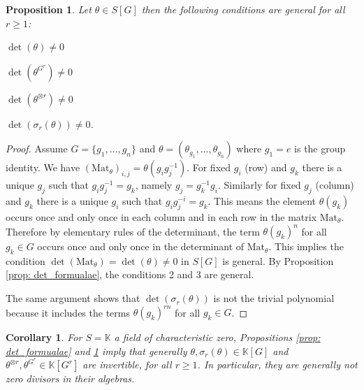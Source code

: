 \documentclass[final]{article}
\newcommand{\K}{\mathbb{K}}
\newcommand{\Mat}{\text{Mat}}
\theoremstyle{definition}
\theoremstyle{plain}
\newtheorem{proposition}[definition]{Proposition}
\newtheorem{corollary}[definition]{Corollary}
\begin{document}
\begin{proposition}\label{prop:general conditions}
    Let $\theta \in S[G]$ then the following conditions are  general for all $r\geq 1$:\vspace{2mm}
    \begin{center}
        
    \begin{enumerate*}
        \item $\det(\theta) \neq 0$\hspace{4mm}
        \item $\det(\theta^{G^r}) \neq 0$\hspace{4mm} 
        \item $\det(\theta^{\otimes r}) \neq 0$\hspace{4mm}
        \item $\det(\sigma_r(\theta)) \neq 0$.
    \end{enumerate*}
    
    \end{center}
    \vspace{2mm}
\end{proposition}
\begin{proof}
    Assume $G = \{g_1, \hdots, g_{n}\}$ and $\theta=(\theta_{g_1}, \hdots, \theta_{g_{n}})$ where $g_1 = e$ is the group identity. 
    We have $(\Mat_\theta)_{i,j} = \theta(g_i g_j^{-1})$. For fixed $g_i$ (row) and  $g_k$ there is a unique $g_j$ such that $g_ig_j^{-1} = g_k$, namely $g_j=g_k^{-1} g_i$.
    Similarly for fixed  $g_j$ (column) and  $g_k$ there is a unique $g_i$ such that $g_ig_j^{-i} = g_k$.
    This means the element $\theta(g_k)$ occurs once and only once in each column and in each row in the matrix $\Mat_\theta$.
    Therefore by elementary rules of the determinant, the term $\theta(g_k)^n$ for all $g_k \in G$ occurs once and only once in the determinant of $\Mat_\theta$. 
    This implies the condition $\det(\Mat_\theta) = \det(\theta) \neq 0$ in $S[G]$ is general.
    By Proposition \ref{prop: det_formualae}, the conditions 2 and 3 are general.

    The same argument shows that $\det(\sigma_r(\theta))$  is not the trivial polynomial because it includes the terms $\theta(g_k)^{rn}$ for all $g_k \in G$.   
\end{proof}

\begin{corollary}\label{cor: general_filter_not_zero_divisors}
For $S = \K$ a field of characteristic zero,
Propositions \ref{prop: det_formualae} and \ref{prop:general conditions} imply that generally $\theta, \sigma_r(\theta) \in \K[G]$ and $\theta^{\otimes r}, \theta^{G^r} \in \K[G^r]$ are invertible, for all $r\geq 1$. In particular, they are generally not zero divisors in their algebras. 
\end{corollary}
\end{document}
